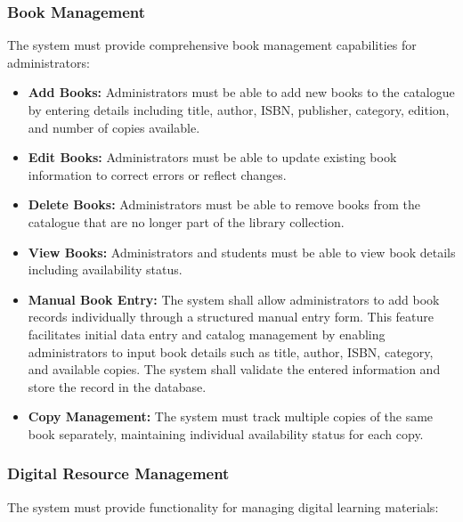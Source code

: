\documentclass[12pt,a4paper]{report}
\begin{document}
\subsubsection{Book Management}

The system must provide comprehensive book management capabilities for administrators:

\begin{itemize}
    \item \textbf{Add Books:} Administrators must be able to add new books to the catalogue by entering details including title, author, ISBN, publisher, category, edition, and number of copies available.
    
    \item \textbf{Edit Books:} Administrators must be able to update existing book information to correct errors or reflect changes.
    
    \item \textbf{Delete Books:} Administrators must be able to remove books from the catalogue that are no longer part of the library collection.
    
    \item \textbf{View Books:} Administrators and students must be able to view book details including availability status.
    
\item \textbf{Manual Book Entry:} The system shall allow administrators to add book records individually through a structured manual entry form. This feature facilitates initial data entry and catalog management by enabling administrators to input book details such as title, author, ISBN, category, and available copies. The system shall validate the entered information and store the record in the database.
    
    \item \textbf{Copy Management:} The system must track multiple copies of the same book separately, maintaining individual availability status for each copy.
\end{itemize}

\newpage

\subsubsection{Digital Resource Management}

The system must provide functionality for managing digital learning materials:
\end{document}
